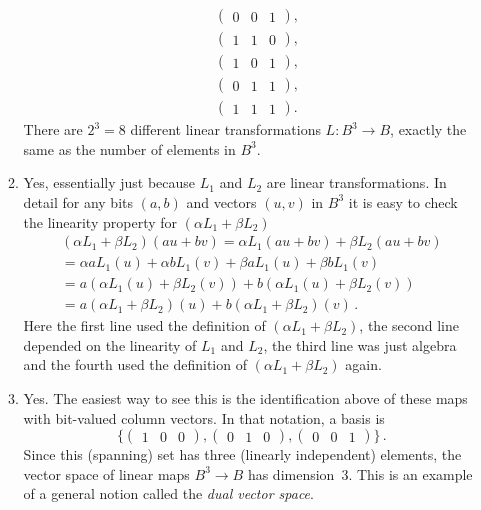 \begin{enumerate}
\begin{enumerate}
\begin{align*}
&\begin{pmatrix}0 & 0 & 1\end{pmatrix} ,\\
&\begin{pmatrix}1 & 1 & 0\end{pmatrix} ,\\
&\begin{pmatrix}1 & 0 & 1\end{pmatrix} ,\\
&\begin{pmatrix}0 & 1 & 1\end{pmatrix} ,\\
&\begin{pmatrix}1 & 1  & 1\end{pmatrix} .
\end{align*}
There are $2^3=8$ different linear transformations $L:B^3\to B$, exactly the same as the number of elements in $B^3$.
\item Yes, essentially just because $L_1$ and $L_2$ are linear transformations. In detail for any bits
$(a,b)$ and vectors $(u,v)$ in $B^3$ it is easy to check the linearity property for $(\alpha L_1+\beta L_2)$
\begin{gather*}(\alpha L_1+\beta L_2)(a u + b v)=\alpha L_1(a u + b v)+\beta L_2(au + bv) 
\\
=\alpha a L_1(u) + \alpha b L_1(v)+ \beta a L_1(u) + \beta b L_1(v) 
\\= a (\alpha L_1(u) + \beta L_2(v))
+ b (\alpha L_1(u) + \beta L_2(v))
\\
=a (\alpha L_1 + \beta L_2)(u) + b  (\alpha L_1 + \beta L_2)(v)\, .
\end{gather*}
Here the first line used the definition of $(\alpha L_1 + \beta L_2)$, the second line depended on
the linearity of $L_1$ and $L_2$, the third line was just algebra and the fourth used the definition of $(\alpha L_1+ \beta L_2)$ again.
\item Yes. The easiest way to see this is the identification above of these maps with bit-valued column vectors. In that notation, a basis is 
\[\Big\{\begin{pmatrix}1&0&0\end{pmatrix},\begin{pmatrix}0&1&0\end{pmatrix},\begin{pmatrix}0&0&1\end{pmatrix}\Big\}\, .\]
Since this (spanning) set has three (linearly independent) elements, the vector space of linear maps $B^3\to B$ has dimension~3. This is an example of a general notion called the {\itshape dual vector space}.\end{enumerate}


\end{enumerate}
